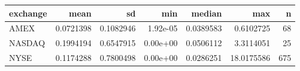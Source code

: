 
\begin{tabular}{lrrrrrr}
\toprule
exchange & mean & sd & min & median & max & n\\
\midrule
AMEX & 0.0721398 & 0.1082946 & 1.92e-05 & 0.0389583 & 0.6102725 & 68\\
NASDAQ & 0.1994194 & 0.6547915 & 0.00e+00 & 0.0506112 & 3.3114051 & 25\\
NYSE & 0.1174288 & 0.7800498 & 0.00e+00 & 0.0286251 & 18.0175586 & 675\\
\bottomrule
\end{tabular}
